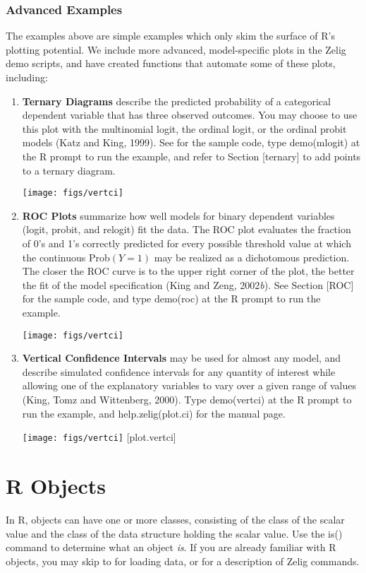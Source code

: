 \documentclass[letterpaper,10pt,english]{sphinxmanual}
\begin{document}
\subsection{Advanced Examples}
\label{5_graphing_commands:advanced-examples}
The examples above are simple examples which only skim the surface of
R’s plotting potential. We include more advanced, model-specific plots
in the Zelig demo scripts, and have created functions that automate some
of these plots, including:
\begin{enumerate}
\item {} 
\textbf{Ternary Diagrams} describe the predicted probability of a
categorical dependent variable that has three observed outcomes. You
may choose to use this plot with the multinomial logit, the ordinal
logit, or the ordinal probit models (Katz and King, 1999). See for
the sample code, type demo(mlogit) at the R prompt to run the
example, and refer to Section {[}ternary{]} to add points to a ternary
diagram.

\texttt{[image: figs/vertci]}

\item {} 
\textbf{ROC Plots} summarize how well models for binary dependent
variables (logit, probit, and relogit) fit the data. The ROC plot
evaluates the fraction of 0’s and 1’s correctly predicted for every
possible threshold value at which the continuous
Prob\((Y = 1)\) may be realized as a dichotomous prediction.
The closer the ROC curve is to the upper right corner of the plot,
the better the fit of the model specification (King and Zeng,
2002\emph{b}). See Section {[}ROC{]} for the sample code, and type demo(roc)
at the R prompt to run the example.

\texttt{[image: figs/vertci]}

\item {} 
\textbf{Vertical Confidence Intervals} may be used for almost any model,
and describe simulated confidence intervals for any quantity of
interest while allowing one of the explanatory variables to vary over
a given range of values (King, Tomz and Wittenberg, 2000). Type
demo(vertci) at the R prompt to run the example, and
help.zelig(plot.ci) for the manual page.

\texttt{[image: figs/vertci]} {[}plot.vertci{]}

\end{enumerate}


\chapter{R Objects}
\label{6_R_objects:r-objects}\label{6_R_objects::doc}
In R, objects can have one or more classes, consisting of the class of
the scalar value and the class of the data structure holding the scalar
value. Use the is() command to determine what an object \emph{is}. If you are
already familiar with R objects, you may skip to for loading data, or
for a description of Zelig commands.
\end{document}
